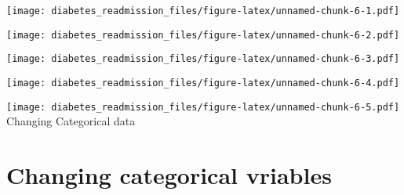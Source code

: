 \documentclass[]{article}
\newenvironment{Shaded}{\begin{snugshade}}{\end{snugshade}}
\newcommand{\KeywordTok}[1]{\textcolor[rgb]{0.13,0.29,0.53}{\textbf{#1}}}
\newcommand{\DataTypeTok}[1]{\textcolor[rgb]{0.13,0.29,0.53}{#1}}
\newcommand{\StringTok}[1]{\textcolor[rgb]{0.31,0.60,0.02}{#1}}
\newcommand{\CommentTok}[1]{\textcolor[rgb]{0.56,0.35,0.01}{\textit{#1}}}
\newcommand{\OperatorTok}[1]{\textcolor[rgb]{0.81,0.36,0.00}{\textbf{#1}}}
\newcommand{\NormalTok}[1]{#1}
\begin{document}
\texttt{[image: diabetes\_readmission\_files/figure-latex/unnamed-chunk-6-1.pdf]}

\begin{Shaded}
\end{Shaded}

\texttt{[image: diabetes\_readmission\_files/figure-latex/unnamed-chunk-6-2.pdf]}

\begin{Shaded}
\end{Shaded}

\texttt{[image: diabetes\_readmission\_files/figure-latex/unnamed-chunk-6-3.pdf]}

\begin{Shaded}
\end{Shaded}

\texttt{[image: diabetes\_readmission\_files/figure-latex/unnamed-chunk-6-4.pdf]}

\begin{Shaded}
\end{Shaded}

\texttt{[image: diabetes\_readmission\_files/figure-latex/unnamed-chunk-6-5.pdf]}
Changing Categorical data

\section{Changing categorical
vriables}\label{changing-categorical-vriables}
\end{document}
